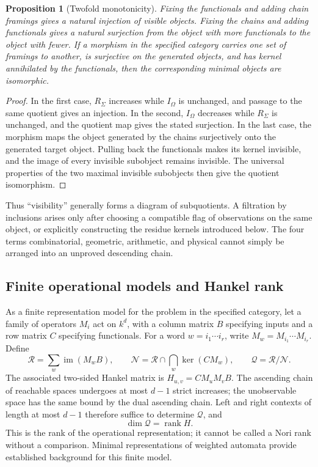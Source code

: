\documentclass[11pt,a4paper,oneside]{article}
\theoremstyle{plain}
\newtheorem{proposition}[theorem]{Proposition}
\theoremstyle{definition}
\theoremstyle{remark}
\newcommand{\rank}{\operatorname{rank}}
\newcommand{\im}{\operatorname{im}}
\numberwithin{equation}{section}
\begin{document}
\begin{proposition}[Twofold monotonicity]\label{prop:visible}
Fixing the functionals and adding chain framings gives a natural injection of visible objects. Fixing the chains and adding functionals gives a natural surjection from the object with more functionals to the object with fewer. If a morphism in the specified category carries one set of framings to another, is surjective on the generated objects, and has kernel annihilated by the functionals, then the corresponding minimal objects are isomorphic.
\end{proposition}
\begin{proof}
In the first case, $R_\Sigma$ increases while $I_\Omega$ is unchanged, and passage to the same quotient gives an injection. In the second, $I_\Omega$ decreases while $R_\Sigma$ is unchanged, and the quotient map gives the stated surjection. In the last case, the morphism maps the object generated by the chains surjectively onto the generated target object. Pulling back the functionals makes its kernel invisible, and the image of every invisible subobject remains invisible. The universal properties of the two maximal invisible subobjects then give the quotient isomorphism.
\end{proof}

Thus ``visibility'' generally forms a diagram of subquotients. A filtration by inclusions arises only after choosing a compatible flag of observations on the same object, or explicitly constructing the residue kernels introduced below. The four terms combinatorial, geometric, arithmetic, and physical cannot simply be arranged into an unproved descending chain.


\subsection{Finite operational models and Hankel rank}
As a finite representation model for the problem in the specified category, let a family of operators $M_i$ act on $k^d$, with a column matrix $B$ specifying inputs and a row matrix $C$ specifying functionals. For a word $w=i_1\cdots i_r$, write $M_w=M_{i_1}\cdots M_{i_r}$. Define
\begin{equation}
 \mathcal R=\sum_w\im(M_wB),\qquad
 \mathcal N=\mathcal R\cap\bigcap_w\ker(CM_w),\qquad
 \mathcal Q=\mathcal R/\mathcal N.
\end{equation}
The associated two-sided Hankel matrix is $H_{u,v}=CM_uM_vB$. The ascending chain of reachable spaces undergoes at most $d-1$ strict increases; the unobservable space has the same bound by the dual ascending chain. Left and right contexts of length at most $d-1$ therefore suffice to determine $\mathcal Q$, and
\begin{equation}\label{eq:hankel}
 \dim\mathcal Q=\rank H.
\end{equation}
This is the rank of the operational representation; it cannot be called a Nori rank without a comparison. Minimal representations of weighted automata provide established background for this finite model\cite{kiefer}.
\end{document}
